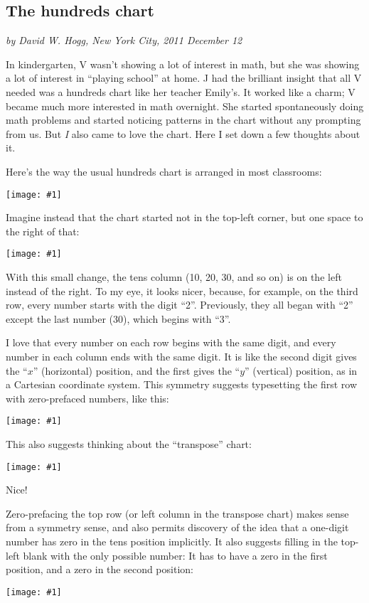 \documentclass[12pt,pdftex]{article}
\newcommand{\showchart}[1]{\texttt{[image: \#1]}}
\begin{document}
\subsection*{The hundreds chart}

\noindent
\textsl{by David W. Hogg, New York City, 2011 December 12}
\vspace{1ex}

In kindergarten, V wasn't showing a lot of interest in math, but she
was showing a lot of interest in ``playing school'' at home.  J had
the brilliant insight that all V needed was a hundreds chart like her
teacher Emily's.  It worked like a charm; V became much more
interested in math overnight.  She started spontaneously doing math
problems and started noticing patterns in the chart without any
prompting from us.  But \emph{I} also came to love the chart.  Here I
set down a few thoughts about it.

Here's the way the usual hundreds chart is arranged in most
classrooms:
\begin{center}
\showchart{hundreds_chart_standard.pdf}
\end{center}

Imagine instead that the chart started not in the top-left corner,
but one space to the right of that:
\begin{center}
\showchart{hundreds_chart_skipzero_nzp.pdf}
\end{center}
With this small change, the tens column (10, 20, 30, and so on) is on
the left instead of the right.  To my eye, it looks nicer, because,
for example, on the third row, every number starts with the digit
``2''.  Previously, they all began with ``2'' except the last number
(30), which begins with ``3''.

I love that every number on each row begins with the same digit, and
every number in each column ends with the same digit.  It is like the
second digit gives the ``$x$'' (horizontal) position, and the first
gives the ``$y$'' (vertical) position, as in a Cartesian coordinate
system.  This symmetry suggests typesetting the first row with
zero-prefaced numbers, like this:
\begin{center}
\showchart{hundreds_chart_skipzero.pdf}
\end{center}
This also suggests thinking about the ``transpose'' chart:
\begin{center}
\showchart{hundreds_chart_transpose_skipzero.pdf}
\end{center}
Nice!

Zero-prefacing the top row (or left column in the transpose chart)
makes sense from a symmetry sense, and also permits discovery of the
idea that a one-digit number has zero in the tens position implicitly.
It also suggests filling in the top-left blank with the only possible
number: It has to have a zero in the first position, and a zero in the
second position:
\begin{center}
\showchart{hundreds_chart_default.pdf}
\end{center}
\end{document}
